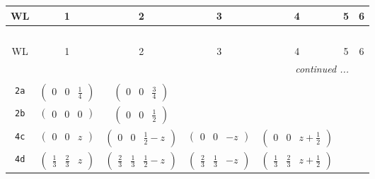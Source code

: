 \documentclass[fleqn,9pt,landscape]{jsarticle}
\begin{document}
\begin{center}
\renewcommand{\arraystretch}{1.2}
\begin{longtable}{ccccccc}
 \hline \hline
WL & 1 & 2 & 3 & 4 & 5 & 6 \\ \hline \endfirsthead

\multicolumn{6}{l}{\tablename\ \thetable{}} \\
 \hline \hline
WL & 1 & 2 & 3 & 4 & 5 & 6 \\ \hline \endhead

 \hline \hline
\multicolumn{6}{r}{\footnotesize\it continued ...} \\ \endfoot

 \hline \hline
\multicolumn{6}{r}{} \\ \endlastfoot

{\tt 2a} & $ \begin{pmatrix} 0 & 0 & \frac{1}{4} \end{pmatrix} $ & $ \begin{pmatrix} 0 & 0 & \frac{3}{4} \end{pmatrix} $ & $  $ & $  $ & $  $ & $  $ \\ \hline
{\tt 2b} & $ \begin{pmatrix} 0 & 0 & 0 \end{pmatrix} $ & $ \begin{pmatrix} 0 & 0 & \frac{1}{2} \end{pmatrix} $ & $  $ & $  $ & $  $ & $  $ \\ \hline
{\tt 4c} & $ \begin{pmatrix} 0 & 0 & z \end{pmatrix} $ & $ \begin{pmatrix} 0 & 0 & \frac{1}{2} - z \end{pmatrix} $ & $ \begin{pmatrix} 0 & 0 & - z \end{pmatrix} $ & $ \begin{pmatrix} 0 & 0 & z + \frac{1}{2} \end{pmatrix} $ & $  $ & $  $ \\ \hline
{\tt 4d} & $ \begin{pmatrix} \frac{1}{3} & \frac{2}{3} & z \end{pmatrix} $ & $ \begin{pmatrix} \frac{2}{3} & \frac{1}{3} & \frac{1}{2} - z \end{pmatrix} $ & $ \begin{pmatrix} \frac{2}{3} & \frac{1}{3} & - z \end{pmatrix} $ & $ \begin{pmatrix} \frac{1}{3} & \frac{2}{3} & z + \frac{1}{2} \end{pmatrix} $ & $  $ & $  $ \\ \hline

\end{longtable}
\end{center}
\end{document}

